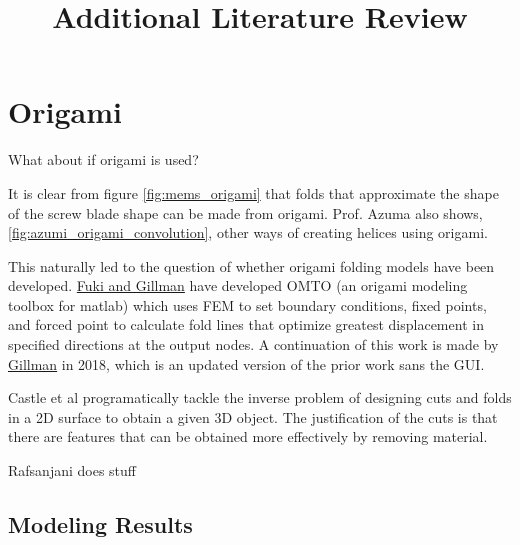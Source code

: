 \documentclass[twocolumn]{article}
\title{Additional Literature Review}
\begin{document}
\section{Origami}

What about if origami is used? 

It is clear from figure \ref{fig:mems_origami} that folds that approximate the shape of the screw blade shape can be made from origami. Prof. Azuma also shows, \ref{fig:azumi_origami_convolution}, other ways of creating helices using origami. 



This naturally led to the question of whether origami folding models have been developed. \href{https://www.mathworks.com/matlabcentral/fileexchange/51811-origami-mechanism-topology-optimizer-omto}{Fuki and Gillman} have developed OMTO (an origami modeling toolbox for matlab) which uses FEM to set boundary conditions, fixed points, and forced point to calculate fold lines that optimize greatest displacement in specified directions at the output nodes. A continuation of this work is made by \href{https://www.mathworks.com/matlabcentral/fileexchange/69612-origami-topology-optimization-w-nonlinear-truss-model}{Gillman} in 2018, which is an updated version of the prior work sans the GUI. 

\cite{Castle2014} Castle et al programatically tackle the inverse problem of designing cuts and folds in a 2D surface to obtain a given 3D object. The justification of the cuts is that there are features that can be obtained more effectively by removing material.  


\cite{Rafsanjani2017} Rafsanjani does stuff 

\subsection{Modeling Results}
\end{document}
